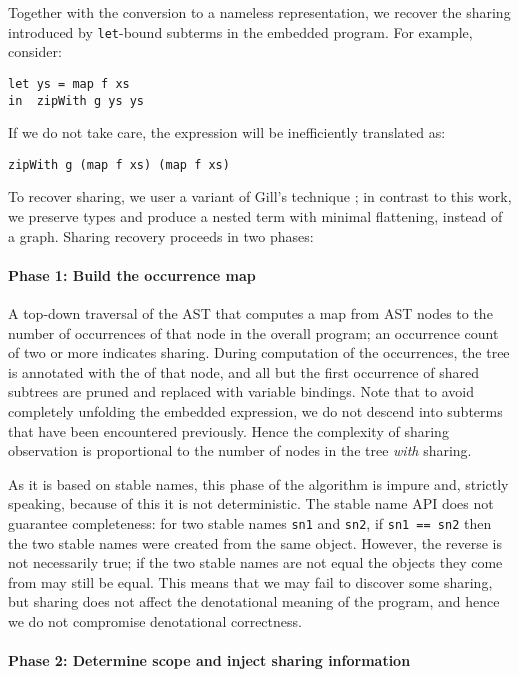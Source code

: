 Together with the conversion to a nameless representation, we recover the
sharing introduced by \texttt{let}-bound subterms in the embedded program. For
example, consider:
%
\begin{lstlisting}[style=Haskell]
let ys = map f xs
in  zipWith g ys ys
\end{lstlisting}
%
If we do not take care, the expression will be inefficiently translated as:
%
\begin{lstlisting}[style=Haskell]
zipWith g (map f xs) (map f xs)
\end{lstlisting}
%
To recover sharing, we user a variant of Gill's technique \cite{Gill:2009}; in
contrast to this work, we preserve types and produce a nested term with minimal
flattening, instead of a graph. Sharing recovery proceeds in two phases:

\paragraph{Phase 1: Build the occurrence map}

A top-down traversal of the AST that computes a map from AST nodes to the number
of occurrences of that node in the overall program; an occurrence count of two
or more indicates sharing. During computation of the occurrences, the tree is
annotated with the  \cite{Jones:2000} of that node, and all
but the first occurrence of shared subtrees are pruned and replaced with
variable bindings. Note that to avoid completely unfolding the embedded
expression, we do not descend into subterms that have been encountered
previously. Hence the complexity of sharing observation is proportional to the
number of nodes in the tree \emph{with} sharing.

As it is based on stable names, this phase of the algorithm is impure and,
strictly speaking, because of this it is not deterministic. The stable name
API does not guarantee completeness: for two stable names \lstinline{sn1} and
\lstinline{sn2}, if \lstinline{sn1 == sn2} then the two stable names were
created from the same object. However, the reverse is not necessarily true; if
the two stable names are not equal the objects they come from may still be
equal. This means that we may fail to discover some sharing, but sharing does
not affect the denotational meaning of the program, and hence we do not
compromise denotational correctness.


\paragraph{Phase 2: Determine scope and inject sharing information}

